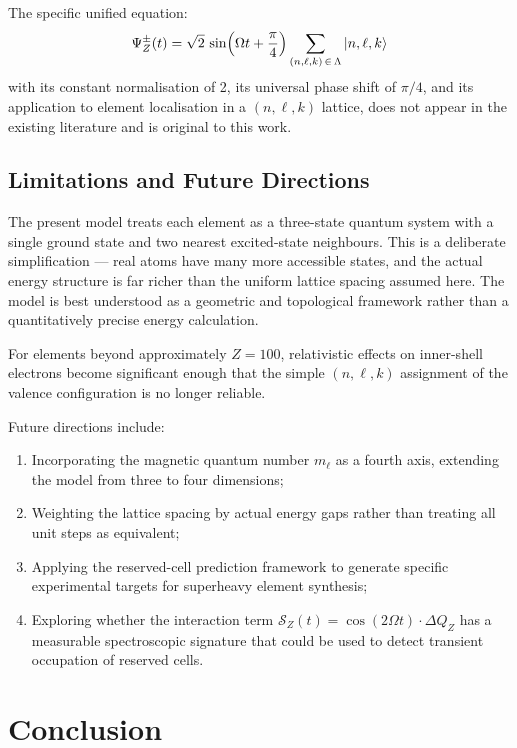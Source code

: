 \documentclass[12pt, a4paper]{article}
\newcommand{\Int}{\mathcal{S}}           %
\newcommand{\Lattice}{\Lambda}           %
\newcommand{\Psipm}{\Psi_{Z}^{\pm}}     %
\newcommand{\DQ}{\Delta Q_{Z}}          %
\begin{document}
The specific unified equation:
\[
  \Psipm(t) = \sqrt{2}\,\sin\!\left(\Omega t + \frac{\pi}{4}\right)
  \sum_{(n,\ell,k)\,\in\,\Lattice} \ket{n,\ell,k}
\]
with its constant normalisation of 2, its universal phase shift of $\pi/4$, and its application
to element localisation in a $(n, \ell, k)$ lattice, does not appear in the existing literature
and is original to this work.

\subsection{Limitations and Future Directions}

The present model treats each element as a three-state quantum system with a single
ground state and two nearest excited-state neighbours. This is a deliberate simplification ---
real atoms have many more accessible states, and the actual energy structure is far richer
than the uniform lattice spacing assumed here. The model is best understood as a geometric
and topological framework rather than a quantitatively precise energy calculation.

For elements beyond approximately $Z=100$, relativistic effects on inner-shell electrons
become significant enough that the simple $(n, \ell, k)$ assignment of the valence
configuration is no longer reliable.

Future directions include:
\begin{enumerate}[leftmargin=2em]
  \item Incorporating the magnetic quantum number $m_\ell$ as a fourth axis, extending the
        model from three to four dimensions;
  \item Weighting the lattice spacing by actual energy gaps rather than treating all unit
        steps as equivalent;
  \item Applying the reserved-cell prediction framework to generate specific experimental
        targets for superheavy element synthesis;
  \item Exploring whether the interaction term $\Int_Z(t) = \cos(2\Omega t)\cdot\DQ$ has a
        measurable spectroscopic signature that could be used to detect transient occupation
        of reserved cells.
\end{enumerate}

\section{Conclusion}
\end{document}
